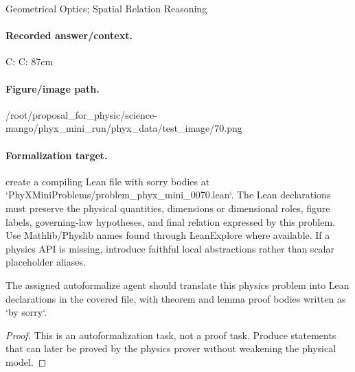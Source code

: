 Geometrical Optics; Spatial Relation Reasoning

\paragraph{Recorded answer/context.}
C: C: 87cm

\paragraph{Figure/image path.}
/root/proposal\_for\_physic/science-mango/phyx\_mini\_run/phyx\_data/test\_image/70.png

\paragraph{Formalization target.}
create a compiling Lean file with sorry bodies at `PhyXMiniProblems/problem\_phyx\_mini\_0070.lean`. The Lean declarations must preserve the physical quantities, dimensions or dimensional roles, figure labels, governing-law hypotheses, and final relation expressed by this problem.
Use Mathlib/Physlib names found through LeanExplore where available. If a physics API is missing, introduce faithful local abstractions rather than scalar placeholder aliases.

\begin{theorem}
\label{thm:physics:phyx_mini_0070:target}
The assigned autoformalize agent should translate this physics problem into Lean declarations in the covered file, with theorem and lemma proof bodies written as `by sorry`.
\end{theorem}
\begin{proof}
This is an autoformalization task, not a proof task. Produce statements that can later be proved by the physics prover without weakening the physical model.
\end{proof}

